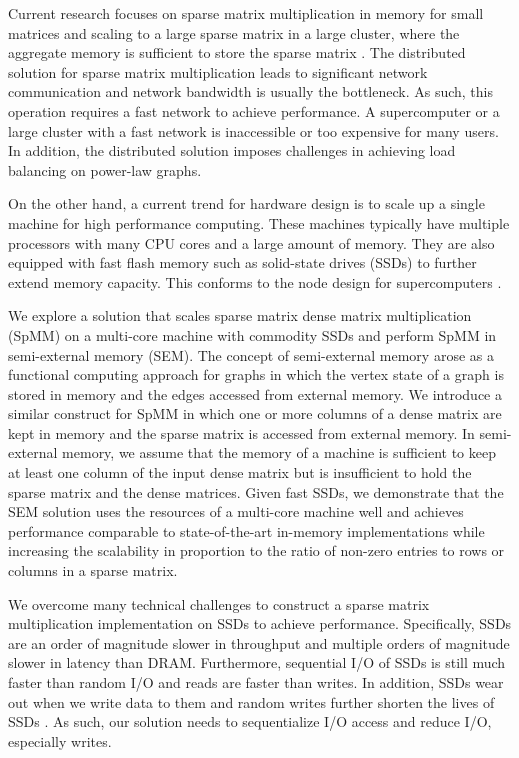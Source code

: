 Current research focuses on sparse matrix multiplication in memory
for small matrices and scaling to a large sparse matrix in a large cluster,
where the aggregate memory is sufficient to store the sparse matrix
\cite{Williams07, Yoo11, Boman2013}.
The distributed solution for sparse matrix multiplication leads to significant
network communication and network bandwidth is usually the bottleneck.
As such, this operation requires a fast network to achieve performance.
A supercomputer or a large cluster with a fast network is inaccessible or
too expensive for many users. In addition, the distributed solution imposes
challenges in achieving load balancing on power-law graphs.


On the other hand, a current trend for hardware design is to scale up
a single machine for high performance computing.
These machines typically have multiple processors with many CPU cores and
a large amount of memory. They are also equipped with fast flash
memory such as solid-state drives (SSDs) to further extend memory capacity.
This conforms to the node design for supercomputers \cite{Ang14}.

We explore a solution that scales sparse matrix dense matrix multiplication
(SpMM) on a multi-core machine with commodity SSDs and
perform SpMM in semi-external memory (SEM). The concept of semi-external memory
arose as a functional computing approach for graphs \cite{Abello98} in which
the vertex state of a graph is stored in memory and the edges accessed from
external memory. We introduce a similar construct for SpMM in which one or more
columns of a dense matrix are kept in memory and the sparse matrix is accessed
from external memory. In semi-external memory, we assume
that the memory of a machine is sufficient to keep at least one column
of the input dense matrix but is insufficient to hold the sparse matrix
and the dense matrices. Given fast SSDs, we demonstrate that the SEM
solution uses the resources of a multi-core machine well and
achieves performance comparable to state-of-the-art in-memory implementations
while increasing the scalability in proportion
to the ratio of non-zero entries to rows or columns in a sparse matrix.


We overcome many technical challenges to construct a sparse matrix
multiplication implementation on SSDs to achieve performance. Specifically,
SSDs are an order of magnitude slower in throughput and multiple orders of
magnitude slower in latency than DRAM. Furthermore, sequential I/O of SSDs
is still much faster
than random I/O \cite{safs} and reads are faster than writes. In addition,
SSDs wear out when we write data to them and random writes further shorten
the lives of SSDs \cite{sfs}. As such, our solution needs to sequentialize
I/O access and reduce I/O, especially writes.

